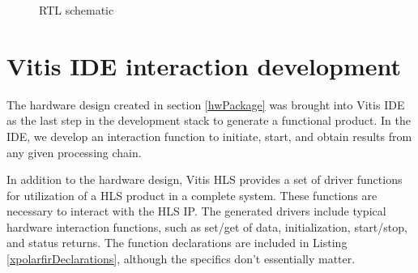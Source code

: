 \documentclass[11pt]{report}
\begin{document}
 \begin{figure}[h!]
 	\begin{center}
 		\fboxsep=0mm
 		\caption{RTL schematic}
 		\label{fig:RTL}
 	\end{center}
 \end{figure}
 \FloatBarrier
 

\section{Vitis IDE interaction development}

The hardware design created in section \ref{hwPackage} was brought into Vitis IDE as the last step in the development stack to generate a functional product. In the IDE, we develop an interaction function to initiate, start, and obtain results from any given processing chain.

In addition to the hardware design, Vitis HLS provides a set of driver functions for utilization of a HLS product in a complete system. These functions are necessary to interact with the HLS IP. The generated drivers include typical hardware interaction functions, such as set/get of data, initialization, start/stop, and status returns. The function declarations are included in Listing \ref{xpolarfirDeclarations}, although the specifics don't essentially matter.
\end{document}
